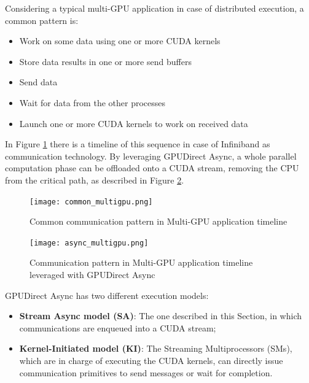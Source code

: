 \documentclass[review]{siamart1116}
\begin{document}
Considering a typical multi-GPU application in case of distributed execution, a common pattern is:
\begin{itemize}
\item Work on some data using one or more CUDA kernels
\item Store data results in one or more send buffers
\item Send data
\item Wait for data from the other processes
\item Launch one or more CUDA kernels to work on received data
\end{itemize}
In Figure \ref{fig:commonmultigpu} there is a timeline of this sequence in case of Infiniband as communication technology. By leveraging GPUDirect Async, a
whole parallel computation phase can be offloaded onto a
CUDA stream, removing the CPU from the critical path, as described
in Figure \ref{fig:asyncmultigpu}.\\

\begin{figure}[h]
\centering
\texttt{[image: common\_multigpu.png]}
\caption{Common communication pattern in Multi-GPU application timeline}
\label{fig:commonmultigpu}
\end{figure}


\begin{figure}[h]
\centering
\texttt{[image: async\_multigpu.png]}
\caption{Communication pattern in Multi-GPU application timeline leveraged with GPUDirect Async}
\label{fig:asyncmultigpu}
\end{figure}

GPUDirect Async has two different execution models:

\begin{itemize}
\item \textbf{Stream Async model (SA)}: The one described in this Section, in which communications are enqueued into a CUDA stream;
\item \textbf{Kernel-Initiated model (KI)}: The Streaming Multiprocessors (SMs), which are in charge of executing the CUDA kernels, can directly issue communication primitives to send messages or wait for completion. %
\end{itemize}
\end{document}
